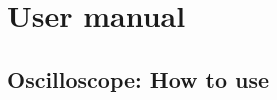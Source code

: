

\part{User manual}
    
    \chapter{Oscilloscope: How to use}
    

    
    
    
\iffalse
    
\fi
